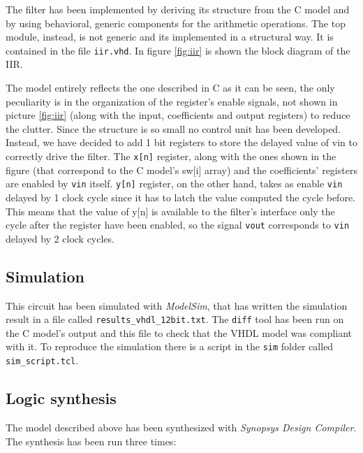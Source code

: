 The filter has been implemented by deriving its structure from the C model and by using behavioral, generic components
for the arithmetic operations. The top module, instead, is not generic and its implemented in a structural way. It is
contained in the file \verb|iir.vhd|. In figure \ref{fig:iir} is shown the block diagram of the IIR.

The model entirely reflects the one described in C as it can be seen, the only peculiarity is in the organization of the
register's enable signals, not shown in picture \ref{fig:iir} (along with the input, coefficients and output registers)
to reduce the clutter.
Since the structure is so small no control unit has been developed. Instead, we have decided to add 1 bit registers to
store the delayed value of vin to correctly drive the filter.
The \verb|x[n]| register, along with the ones shown in the figure (that correspond to the C model's sw[i] array) and the
coefficients' registers are enabled by \verb|vin| itself. \verb|y[n]| register, on the other hand, takes as enable \verb|vin|
delayed by 1 clock cycle since it has to latch the value computed the cycle before. This means that the value of y[n] is
available to the filter's interface only the cycle after the register have been enabled, so the signal \verb|vout| corresponds
to \verb|vin| delayed by 2 clock cycles.

\subsection{Simulation}

This circuit has been simulated with {\it ModelSim}, that has written the simulation result in a file called
\verb|results_vhdl_12bit.txt|. The \verb|diff| tool has been run on the C model's output and this file to check that the
VHDL model was compliant with it.
To reproduce the simulation there is a script in the \verb|sim| folder called \verb|sim_script.tcl|.

\subsection{Logic synthesis}

The model described above has been synthesized with {\it Synopsys Design Compiler}. The synthesis has been run three times:


